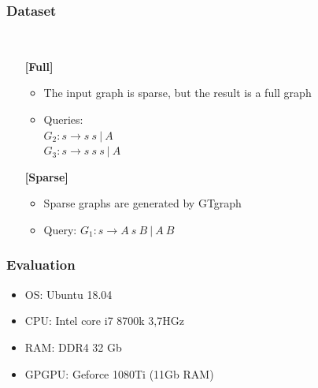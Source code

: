 \documentclass[xcolor=table]{beamer}
\begin{document}
\begin{frame}[fragile] \frametitle{Dataset}
  \begin{minipage}[t]{1cm}
\hspace{1cm}
  \end{minipage}
  ~
\begin{minipage}[t]{0.85\textwidth}
\begin{itemize}
\item[\textbf{[Full]}]
\begin{itemize}
  \item The input graph is sparse, but the result is a full graph
  \item Queries: \\ $G_2: s \to s \ s \ | \ A$ \\ $G_3: s \to s \ s \ s \ | \ A$
\end{itemize}
\pause
\item[\textbf{[Sparse]}]
\begin{itemize}
  \item Sparse graphs are generated by GTgraph
  \item Query: $G_1: s \to A \ s \ B \ | \ A \ B$
\end{itemize}
\end{itemize}
\end{minipage}
\end{frame}

\begin{frame} \frametitle{Evaluation}
  \begin{itemize}
   \item OS: Ubuntu 18.04
   \item CPU: Intel core i7 8700k 3,7HGz
   \item RAM: DDR4 32 Gb
   \item GPGPU: Geforce 1080Ti (11Gb RAM)
  \end{itemize}
\end{frame}
\end{document}
